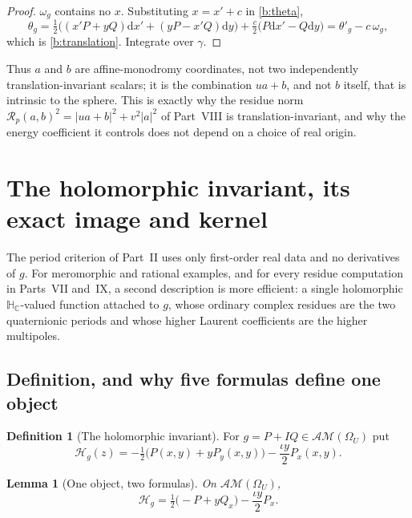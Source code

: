 \documentclass[11pt,a4paper]{article}
\numberwithin{equation}{section}
\newtheorem{lemma}[theorem]{Lemma}
\theoremstyle{definition}
\newtheorem{definition}[theorem]{Definition}
\theoremstyle{remark}
\theoremstyle{plain}
\newcommand{\HC}{\mathbb H_{\mathbb C}}
\newcommand{\AM}{\mathcal{AM}}
\newcommand{\Om}{\Omega}
\newcommand{\om}{\omega}
\newcommand{\thet}{\theta}
\newcommand{\Rp}{\mathcal R_{p}}      %
\newcommand{\Hg}{\mathcal H_{g}}      %
\newcommand{\abs}[1]{\lvert #1\rvert}
\newcommand{\dd}{\mathrm d}
\begin{document}
\begin{proof}
$\om_g$ contains no $x$.  Substituting $x=x'+c$ in \eqref{b:theta},
\[
 \thet_g=\tfrac12\bigl((x'P+yQ)\dd x'+(yP-x'Q)\dd y\bigr)
 +\tfrac{c}{2}\bigl(P\dd x'-Q\dd y\bigr)
 =\thet'_g-c\,\om_g ,
\]
which is \eqref{b:translation}.  Integrate over $\gamma$.
\end{proof}

Thus $a$ and $b$ are affine-monodromy coordinates, not two independently
translation-invariant scalars; it is the combination $ua+b$, and not $b$
itself, that is intrinsic to the sphere.  This is exactly why the residue
norm $\Rp(a,b)^2=\abs{ua+b}^2+v^2\abs{a}^2$ of Part~VIII is
translation-invariant, and why the energy coefficient it controls does not
depend on a choice of real origin.


\section{The holomorphic invariant, its exact image and kernel}
\label{b:sec:invariant}

The period criterion of Part~II uses only first-order real data and no
derivatives of $g$.  For meromorphic and rational examples, and for every
residue computation in Parts~VII and~IX, a second description is more
efficient: a single holomorphic $\HC$-valued function attached to $g$, whose
ordinary complex residues are the two quaternionic periods and whose higher
Laurent coefficients are the higher multipoles.

\subsection{Definition, and why five formulas define one object}
\label{b:sub:Hdef}

\begin{definition}[The holomorphic invariant]
\label{b:def:H}
For $g=P+IQ\in\AM(\Om_U)$ put
\begin{equation}
 \Hg(z)=-\tfrac12\bigl(P(x,y)+yP_y(x,y)\bigr)-\frac{\iota y}{2}P_x(x,y).
 \label{b:H}
\end{equation}
\end{definition}

\begin{lemma}[One object, two formulas]
\label{b:lem:Hforms}
On $\AM(\Om_U)$,
\begin{equation}
 \Hg=\tfrac12\bigl(-P+yQ_x\bigr)-\frac{\iota y}{2}P_x .
 \label{b:H-alt}
\end{equation}
\end{lemma}
\end{document}
